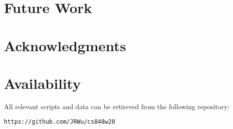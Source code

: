 \documentclass[letterpaper,twocolumn,10pt]{article}
\begin{document}
\section{Future Work}


\section{Acknowledgments}


\section{Availability}\label{Availability}
All relevant scripts and data can be retireved from the following repository:
\begin{center}
{\tt https://github.com/JRWu/cs848w20}
\end{center}

{\footnotesize 

\theendnotes

\newpage
}
\end{document}
